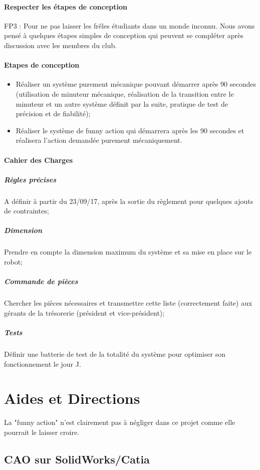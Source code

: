 \documentclass[fleqn,10pt]{SelfArx} %
\begin{document}
\paragraph{Respecter les étapes de conception}
FP3 : Pour ne pas laisser les frêles étudiants dans un monde inconnu. Nous avons pensé à quelques étapes simples de conception qui peuvent se compléter après discussion avec les membres du club.

\paragraph{Etapes de conception}
\begin{itemize}
\item Réaliser un système purement mécanique pouvant démarrer après 90 secondes (utilisation de minuteur mécanique, réalisation de la transition entre le minuteur et un autre système définit par la suite, pratique de test de précision et de fiabilité);
\item Réaliser le système de funny action qui démarrera après les 90 secondes et réalisera l'action demandée purement mécaniquement.
\end{itemize}

\paragraph{Cahier des Charges}
\subparagraph{Règles précises}
A définir à partir du 23/09/17, après la sortie du règlement pour quelques ajouts de contraintes;
\subparagraph{Dimension}
Prendre en compte la dimension maximum du système et sa mise en place sur le robot;
\subparagraph{Commande de pièces}
Chercher les pièces nécessaires et transmettre cette liste (correctement faite) aux gérants de la trésorerie (président et vice-président);
\subparagraph{Tests}
Définir une batterie de test de la totalité du système pour optimiser son fonctionnement le jour J.




\section{Aides et Directions}

La "funny action" n'est clairement pas à négliger dans ce projet comme elle pourrait le laisser croire.
	
\subsection{CAO sur SolidWorks/Catia}
\end{document}
